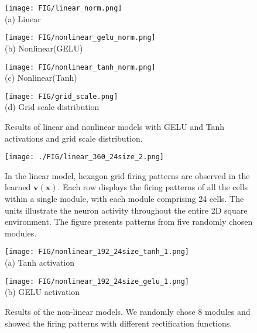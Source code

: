 \documentclass{article}
\def\vv{{\bm{v}}}
\def\vx{{\bm{x}}}
\begin{document}
\begin{figure}[ht]
   \centering
   \begin{minipage}[b]{.2\textwidth}
  \centering
  \texttt{[image: FIG/linear\_norm.png]}
    \\
   {\small (a) Linear}
   \end{minipage}
   \begin{minipage}[b]{.2\textwidth}
  \centering         
   \texttt{[image: FIG/nonlinear\_gelu\_norm.png]}
   \\
   {\small (b) Nonlinear(GELU)}
   \end{minipage}
   \begin{minipage}[b]{.2\textwidth}
  \centering         
   \texttt{[image: FIG/nonlinear\_tanh\_norm.png]}
   \\
   {\small (c) Nonlinear(Tanh)}
   \end{minipage}
   \begin{minipage}[b]{.26\textwidth}
  \centering         
   \texttt{[image: FIG/grid\_scale.png]}
   \\
   {\small (d) Grid scale distribution}
   \end{minipage}
   \caption{\small Results of linear and nonlinear models with GELU and Tanh activations and grid scale distribution. 
   }
    \label{fig:norm}
\end{figure}



\begin{figure*}[ht]
\centering
  \texttt{[image: ./FIG/linear\_360\_24size\_2.png]} \\
  \caption{\small In the linear model, hexagon grid firing patterns are observed in the learned \( \vv(\vx) \). Each row displays the firing patterns of all the cells within a single module, with each module comprising 24 cells. The units illustrate the neuron activity throughout the entire 2D square environment. The figure presents patterns from five randomly chosen modules.}
  \label{fig: hexagon_linear}
\end{figure*}

\begin{figure*}[ht]
   \centering
   \begin{minipage}[b]{.45\textwidth}
  \centering         
   \texttt{[image: FIG/nonlinear\_192\_24size\_tanh\_1.png]}
   \\
   {\small (a) Tanh activation}
   \end{minipage}
   \begin{minipage}[b]{.45\textwidth}
  \centering
  \texttt{[image: FIG/nonlinear\_192\_24size\_gelu\_1.png]}
    \\
   {\small (b) GELU activation}
   \end{minipage}
   \caption{\small Results of the non-linear models. We randomly chose 8 modules and showed the firing patterns with different rectification functions. }
   \label{fig: hexagon_nonlinear}
\end{figure*}
\end{document}
